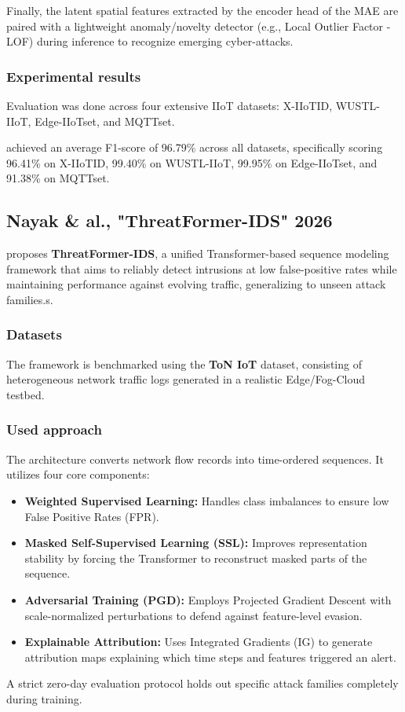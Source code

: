 \documentclass[12pt, a4paper]{report}
\begin{document}
Finally, the latent spatial features extracted by the encoder head of the MAE are paired with a lightweight anomaly/novelty detector (e.g., Local Outlier Factor - LOF) during inference to recognize emerging cyber-attacks.

\subsubsection{Experimental results} 
Evaluation was done across four extensive IIoT datasets: X-IIoTID, WUSTL-IIoT, Edge-IIoTset, and MQTTset.

\cite{safe2025} achieved an average F1-score of 96.79\% across all datasets, specifically scoring 96.41\% on X-IIoTID, 99.40\% on WUSTL-IIoT, 99.95\% on Edge-IIoTset, and 91.38\% on MQTTset.

\subsection{Nayak \& al., "ThreatFormer-IDS" 2026}
\cite{nayak2026threatformer} proposes \textbf{ThreatFormer-IDS}, a unified Transformer-based sequence modeling framework that aims to reliably detect intrusions at low false-positive rates while maintaining performance against evolving traffic, generalizing to unseen attack families.s.
\subsubsection{Datasets}
The framework is benchmarked using the \textbf{ToN IoT} dataset, consisting of heterogeneous network traffic logs generated in a realistic Edge/Fog-Cloud testbed. 

\subsubsection{Used approach }
The architecture converts network flow records into time-ordered sequences. It utilizes four core components:
\begin{itemize}
    \item \textbf{Weighted Supervised Learning:} Handles class imbalances to ensure low False Positive Rates (FPR).
    \item \textbf{Masked Self-Supervised Learning (SSL):} Improves representation stability by forcing the Transformer to reconstruct masked parts of the sequence.
    \item \textbf{Adversarial Training (PGD):} Employs Projected Gradient Descent with scale-normalized perturbations to defend against feature-level evasion.
    \item \textbf{Explainable Attribution:} Uses Integrated Gradients (IG) to generate attribution maps explaining which time steps and features triggered an alert.
\end{itemize}
A strict zero-day evaluation protocol holds out specific attack families completely during training.
\end{document}
